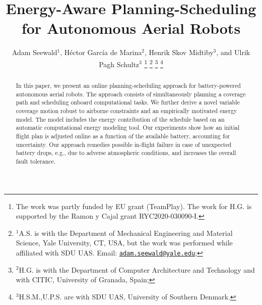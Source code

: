 \documentclass[letterpaper,10pt,conference,twoside]{IEEEtran}
\theoremstyle{definition}
\begin{document}

\title{\vspace{6mm}\bfseries\LARGE Energy-Aware Planning-Scheduling for Autonomous Aerial Robots}

\author{
  Adam Seewald$^{\text{1}}$, H\'ector Garc\'ia de Marina$^{\text{2}}$, Henrik Skov Midtiby$^{\text{3}}$, and Ulrik Pagh Schultz$^{\text{3}}$
  \thanks{The work was partly funded by EU grant  (TeamPlay). The work for H.\hspace*{.4ex}G. is supported by the Ramon y Cajal grant \textnumero RYC2020-030090-I.}
  \thanks{$^{\text{1}}$A.\hspace*{.4ex}S. is with the Department of Mechanical Engineering and Material Science, Yale University, CT, USA, but the work was performed while affiliated with SDU UAS. Email: {\tt\footnotesize \href{mailto:adam.seewald@yale.edu}{adam.seewald@yale.edu}};}
  \thanks{$^{\text{2}}$H.\hspace*{.4ex}G. is with the Department of Computer Architecture and Technology and with CITIC, University of Granada, Spain;} 
  \thanks{$^{\text{3}}$H.\hspace*{.3ex}S.\hspace*{.3ex}M.,\hspace*{.5ex}U.\hspace*{.3ex}P.\hspace*{.3ex}S. are with SDU UAS, %
  University of Southern Denmark.}
}


\maketitle

\vspace*{-.6ex}
\begin{abstract}
  In this paper, we present an online planning-scheduling approach for battery-powered autonomous aerial robots. The approach consists of simultaneously planning a coverage path and scheduling onboard computational tasks. We further derive a novel variable coverage motion robust to airborne constraints and an empirically motivated energy model. The model includes the energy contribution of the schedule based on an automatic computational energy modeling tool. Our experiments show how an initial flight plan is adjusted online as a function of the available battery, accounting for uncertainty. Our approach %
  remedies possible in-flight failure in case of unexpected battery drops, e.g., due to adverse atmospheric conditions, and increases the overall fault tolerance.
\end{abstract}
\end{document}
